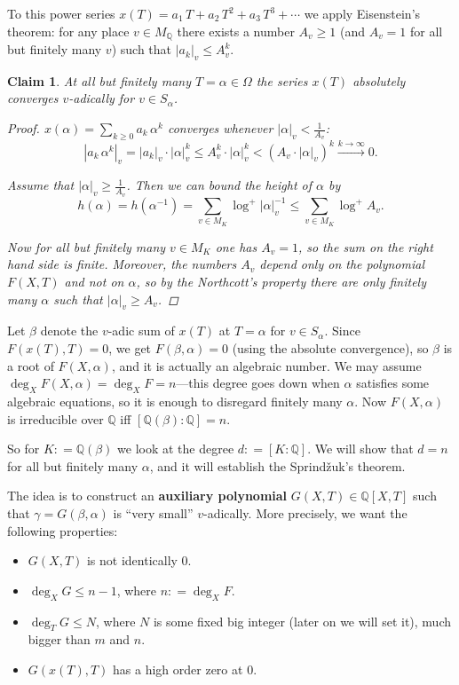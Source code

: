 \documentclass{article}
\newcommand{\term}{\textbf}
\newcommand{\dfn}{\mathrel{\mathop:}=}
\newcommand{\QQ}{\mathbb{Q}}
\theoremstyle{myplain}
\newtheorem*{claim}{Claim}
\theoremstyle{mydefinition}
\begin{document}
To this power series $x (T) = a_1\,T + a_2\,T^2 + a_3\,T^3 + \cdots$ we apply
Eisenstein's theorem: for any place $v \in M_\QQ$ there exists a number
$A_v \ge 1$ (and $A_v = 1$ for all but finitely many $v$) such that
$|a_k|_v \le A_v^k$.

\begin{claim}
  At all but finitely many $T = \alpha \in \Omega$ the series $x (T)$ absolutely
  converges $v$-adically for $v \in S_\alpha$.

  \begin{proof}
    $x (\alpha) = \sum_{k \ge 0} a_k\,\alpha^k$ converges whenever
    $|\alpha|_v < \frac{1}{A_v}$:
    \[ |a_k \, \alpha^k|_v =
      |a_k|_v \cdot |\alpha|^k_v \le A_v^k \cdot |\alpha|_v^k <
      (A_v \cdot |\alpha|_v)^k \xrightarrow{k\to\infty} 0. \]

    Assume that $|\alpha|_v \ge \frac{1}{A_v}$. Then we can bound the height of
    $\alpha$ by
    \[ h (\alpha) = h (\alpha^{-1}) =
      \sum_{v\in M_K} \log^+ |\alpha|^{-1}_v \le
      \sum_{v\in M_K} \log^+ A_v. \]

    Now for all but finitely many $v\in M_K$ one has $A_v = 1$, so the sum on
    the right hand side is finite. Moreover, the numbers $A_v$ depend only on
    the polynomial $F (X,T)$ and not on $\alpha$, so by the Northcott's property
    there are only finitely many $\alpha$ such that $|\alpha|_v \ge A_v$.
  \end{proof}
\end{claim}

Let $\beta$ denote the $v$-adic sum of $x (T)$ at $T = \alpha$ for
$v \in S_\alpha$. Since $F (x(T),T) = 0$, we get $F (\beta,\alpha) = 0$ (using
the absolute convergence), so $\beta$ is a root of $F (X, \alpha)$, and it is
actually an algebraic number. We may assume
$\deg_X F (X, \alpha) = \deg_X F = n$---this degree goes down when $\alpha$
satisfies some algebraic equations, so it is enough to disregard finitely many
$\alpha$. Now $F (X,\alpha)$ is irreducible over $\QQ$ iff
$[\QQ (\beta) : \QQ] = n$.

So for $K \dfn \QQ (\beta)$ we look at the degree $d \dfn [K : \QQ]$. We will
show that $d = n$ for all but finitely many $\alpha$, and it will establish the
Sprind\v{z}uk's theorem.

\vspace{1em}

The idea is to construct an \term{auxiliary polynomial} $G (X,T) \in \QQ [X,T]$
such that $\gamma = G (\beta,\alpha)$ is ``very small'' $v$-adically. More
precisely, we want the following properties:
\begin{itemize}
\item $G (X,T)$ is not identically $0$.

\item $\deg_X G \le n-1$, where $n \dfn \deg_X F$.

\item $\deg_T G \le N$, where $N$ is some fixed big integer (later on we will
  set it), much bigger than $m$ and $n$.

\item $G (x(T), T)$ has a high order zero at $0$.
\end{itemize}
\end{document}
